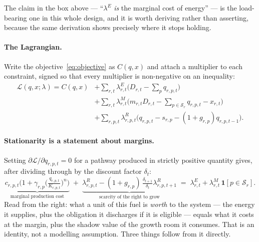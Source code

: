 \documentclass[11pt,a4paper]{article}
\begin{document}
The claim in the box above --- ``$\lambda^{E}$ \emph{is} the marginal cost of energy'' ---
is the load-bearing one in this whole design, and it is worth deriving rather than
asserting, because the same derivation shows precisely where it stops holding.

\paragraph{The Lagrangian.} Write the objective~\eqref{eq:objective} as $C(q,x)$ and
attach a multiplier to each constraint, signed so that every multiplier is
non-negative on an inequality:
\begin{equation}
\begin{aligned}
\mathcal{L}(q,x;\lambda) = C(q,x)
&+ \sum_{r,t} \lambda^{E}_{r,t}\Big(D_{r,t} - \textstyle\sum_{p} q_{r,p,t}\Big)\\
&+ \sum_{r,t} \lambda^{M}_{r,t}\Big(m_{r,t} D_{r,t} - \textstyle\sum_{p \in \mathcal{S}_r} q_{r,p,t} - x_{r,t}\Big)\\
&+ \sum_{r,p,t} \lambda^{R}_{r,p,t}\Big(q_{r,p,t} - s_{r,p} - (1+g_{r,p})q_{r,p,t-1}\Big).
\end{aligned}
\label{eq:lagrangian}
\end{equation}

\paragraph{Stationarity is a statement about margins.} Setting
$\partial\mathcal{L}/\partial q_{r,p,t} = 0$ for a pathway produced in strictly positive
quantity gives, after dividing through by the discount factor $\delta_t$:
\begin{equation}
\underbrace{c_{r,p,t}\Big(1 + \gamma_{r,p}\big(\tfrac{q_{r,p,t}}{K_{r,p,t}}\big)^{n}\Big)}_{\text{marginal production cost}}
\;+\; \underbrace{\lambda^{R}_{r,p,t} - (1+g_{r,p})\,\tfrac{\delta_{t+1}}{\delta_t}\lambda^{R}_{r,p,t+1}}_{\text{scarcity of the right to grow}}
\;=\;
\lambda^{E}_{r,t} + \lambda^{M}_{r,t}\,\mathbf{1}[p \in \mathcal{S}_r].
\label{eq:stationarity}
\end{equation}
Read from the right: what a unit of this fuel is \emph{worth} to the system --- the
energy it supplies, plus the obligation it discharges if it is eligible --- equals what
it costs at the margin, plus the shadow value of the growth room it consumes. That is an
identity, not a modelling assumption. Three things follow from it directly.
\end{document}
